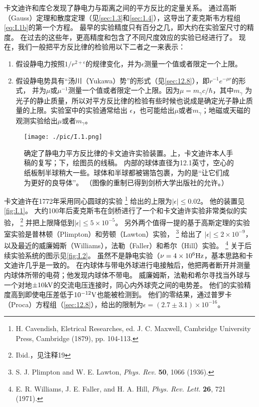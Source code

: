 \documentclass[12pt]{book}
\numberwithin{equation}{chapter}
\numberwithin{figure}{chapter}
\numberwithin{footnote}{page}
\begin{document}
卡文迪许和库仑发现了静电力与距离之间的平方反比的定量关系。
通过高斯（Gauss）定理和散度定理（见\autoref{sec:1.3}和\autoref{sec:1.4}），这导出了麦克斯韦方程组\autoref{eq:I.1b}的第一个方程。
最早的实验精度只有百分之几，即大约在实验室尺寸的精度。
在过去的这些年，更高精度和包含了不同尺度效应的实验已经进行了。
现在，我们一般把平方反比律的检验用以下二者之一来表示：

\begin{enumerate}[label=\alph*]
    \item 假设静电力按照$1/r^{2+\epsilon}$的规律变化，并为$\epsilon$测量一个值或者限定一个上限。
    \item 假设静电势具有“汤川（Yukawa）势”的形式（见\autoref{sec:12.8}），即$r^{-1}e^{-\mu r}$的形式，
          并为$\mu$或$\mu^{-1}$测量一个值或者限定一个上限。因为$\mu=m_{\gamma}c/\hbar$，其中$m_{\gamma}$
          为光子的静止质量，所以对平方反比律的检验有些时候也说成是确定光子静止质量的上限。实验室中的实验通常给出
          $\epsilon$，也可能给出$\mu$或者$m_{\gamma}$；地磁或天磁的观测实验给出$\mu$或者$m_{\gamma}$。
\end{enumerate}

\begin{figure}[!ht]
    \centering
    \texttt{[image: ./pic/I.1.png]}
    \captionsetup{justification=raggedright, singlelinecheck=false}
    \caption{确定了静电力平方反比律的卡文迪许实验装置。上，卡文迪许本人手稿的复写；下，绘图员的线稿。
        内部的球体直径为12.1英寸，空心的纸板制半球稍大一些。球体和半球都被锡箔包裹，为的是“让它们成为更好的良导体”。
        （图像的重制已得到剑桥大学出版社的允许。）}
    \label{fig:I.1}
\end{figure}

卡文迪许在1772年采用同心圆球的实验
\footnote{H. Cavendish, Eletrical Researches, ed. J. C. Maxwell, Cambridge University Press, Cambridge (1879), pp. 104-113.}
给出的上限为$|\epsilon|\leq 0.02$。
他的装置见\autoref{fig:I.1}。
大约100年后麦克斯韦在剑桥进行了一个和卡文迪许实验非常类似的实验，
\footnote{Ibid.，见注释19}
并把上限降低到$|\epsilon|\leq 5\times 10^{-5}$。
另外两个值得一提的基于高斯定理的实验室实验是普林顿（Plimpton）和劳顿（Lawton）实验，
\footnote{S. J. Plimpton and W. E. Lawton, \textit{Phys. Rev.} \textbf{50}, 1066 (1936).}
给出了 $|\epsilon|\le 2\times 10^{-9}$，以及最近的威廉姆斯（Williams），法勒（Faller）和希尔（Hill）实验。
\footnote{E. R. Williams, J. E. Faller, and H. A. Hill, \textit{Phys. Rev. Lett.} \textbf{26}, 721 (1971).}
关于后续实验系统的图示见\autoref{fig:I.2}。
虽然不是静电实验（$\nu=4\times 10^6{\rm Hz}$，基本思路和卡文迪许几乎是一致的。
在内球体与带电外球进行电接触后，他把两者断开并测量内球体所带的电荷；他发现内球体不带电。
威廉姆斯，法勒和希尔寻找当外球与一个对地$\pm 10{\rm kV}$的交流电压连接时，同心内外球壳之间的电势差。
他们的实验精度高到即使电压差低于$10^{-12}{\rm V}$也能被检测到。
他们的零结果，通过普罗卡（Proca）方程组（\autoref{sec:12.8}），给出的限制为$\epsilon=(2.7\pm 3.1)\times 10^{-16}$。
\end{document}
